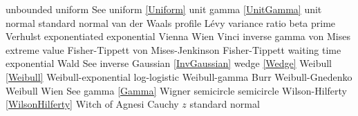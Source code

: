 %
unbounded uniform 				\dotfill	See uniform \eqref{Uniform}			\ncite	%
unit gamma					\dotfill	\eqref{UnitGamma} 					\ncite	%
unit normal					\dotfill	standard normal 					\ncite	%
%
van der Waals profile 			\dotfill	L\'{e}vy 							\ncite	%
variance ratio					\dotfill	beta prime 						\ncite	%
Verhulst						\dotfill	exponentiated exponential					 
Vienna 						\dotfill	Wien 							\ncite	%
Vinci 						\dotfill	inverse gamma 					\ncite	%
von Mises extreme value			\dotfill	Fisher-Tippett 						\ncite	%
von Mises-Jenkinson 			\dotfill	Fisher-Tippett 						\ncite	%
%
waiting time					\dotfill	exponential 						\ncite	%
Wald							\dotfill	See inverse Gaussian	 \eqref{InvGaussian}				\ncite	%
wedge						\dotfill	\eqref{Wedge}  						\ncite	%
Weibull 						\dotfill	\eqref{Weibull} 						\ncite	%
Weibull-exponential 				\dotfill	log-logistic 						\ncite	%
Weibull-gamma					\dotfill	Burr								\ncite	%
Weibull-Gnedenko				\dotfill	Weibull 							\ncite	%
Wien							\dotfill	See gamma \eqref{Gamma}			\ncite	%
Wigner semicircle				\dotfill	semicircle 						\ncite	%
Wilson-Hilferty					\dotfill	\eqref{WilsonHilferty} 				\ncite	%
Witch of Agnesi					\dotfill	Cauchy								%
%	
$z$							\dotfill	standard normal 					\ncite	%



\clearpage


